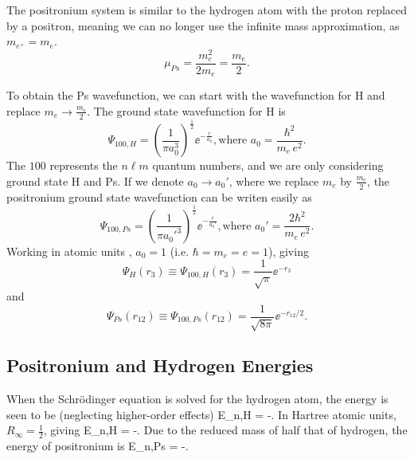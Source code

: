 \documentclass[Introduction.tex]{subfiles}
\begin{document}
The positronium system is similar to the hydrogen atom with the proton replaced by a positron, meaning we can no longer use the infinite mass approximation, as $m_{e^+} = m_e$.
\begin{equation}
\mu_{Ps} = \frac{m_e^2}{2 m_e} = \frac{m_e}{2}.
\end{equation}

To obtain the Ps wavefunction, we can start with the wavefunction for H and replace $m_e \rightarrow \frac{m_e}{2}$.  The ground state wavefunction for H is
\begin{equation}
\Psi_{100,H} = \left(\frac{1}{\pi a_0^3}\right)^{\frac{1}{2}} \!\! \ee^{-\frac{r}{a_0}},
\text{where } a_0 = \frac{\hbar^2}{m_e \,e^2}.
\end{equation}
The $100$ represents the $n \ell m$ quantum numbers, and we are only considering ground state H and Ps. 
If we denote $a_0 \rightarrow a_0'$, where we replace $m_e$ by $\frac{m_e}{2}$, the positronium ground state wavefunction can be writen easily as
\begin{equation}
\Psi_{100,Ps} = \left(\frac{1}{\pi {a_0'}^3}\right)^{\frac{1}{2}} \!\! \ee^{-\frac{r}{a_0'}},
\text{where } a_0' = \frac{2\hbar^2}{m_e \,e^2}.
\end{equation}
Working in atomic units \cite{Hartree1928}, $a_0 = 1$ (i.e. $\hbar = m_e = e = 1$), giving
\begin{equation}
\Psi_H\left(r_3\right) \equiv \Psi_{100,H}\left(r_3\right) = \frac{1}{\sqrt{\pi}} \ee^{-r_3}
\label{eq:HWave}
\end{equation}
and
\begin{equation}
\Psi_{Ps}\left(r_{12}\right) \equiv \Psi_{100,Ps}\left(r_{12}\right) = \frac{1}{\sqrt{8 \pi}} \ee^{-r_{12}/2}.
\label{eq:PsWave}
\end{equation}

\subsection{Positronium and Hydrogen Energies}

When the Schr\"{o}dinger equation is solved for the hydrogen atom, the energy is seen to be (neglecting higher-order effects)
\beq
\label{eq:HEnergy}
E_{n,H} = -.
\eeq
In Hartree atomic units, $R_\infty = \frac{1}{2}$, giving
\beq
\label{eq:HEnergyAU}
E_{n,H} = -.
\eeq
Due to the reduced mass of half that of hydrogen, the energy of positronium is
\beq
\label{eq:PsEnergyAU}
E_{n,Ps} = -.
\eeq
\end{document}
